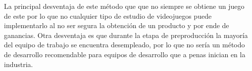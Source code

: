  
La principal desventaja de este método que que no siempre se obtiene un juego de este por lo que no cualquier tipo de estudio de videojuegos puede implementarlo al no ser segura la obtención de un producto y por ende de ganancias. Otra desventaja es que durante la etapa de preproducción la mayoría del equipo de trabajo se encuentra desempleado, por lo que no sería un método de desarrollo recomendable para equipos de desarrollo que a penas inician en la industria.   